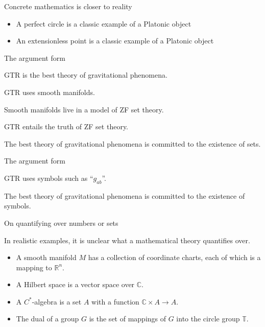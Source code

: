 \documentclass{beamer}
\begin{document}
\begin{frame}{Concrete mathematics is closer to reality}

  \begin{itemize}
  \item A perfect circle is a classic example of a Platonic object
  \item An extensionless point is a classic example of a Platonic
    object
  \end{itemize}

\end{frame}


\begin{frame}{The argument form}

  GTR is the best theory of gravitational phenomena. 

  GTR uses smooth manifolds. 

  Smooth manifolds live in a model of ZF set theory.

  GTR entails the truth of ZF set theory.

  The best theory of gravitational phenomena is committed to the
  existence of sets.

\end{frame}

\begin{frame}{The argument form}

  GTR uses symbols such as ``$g_{ab}$''. 

  The best theory of gravitational phenomena is committed to the
  existence of symbols.

\end{frame}


\begin{frame}{On quantifying over numbers or sets}

  In realistic examples, it is unclear what a mathematical theory
  quantifies over.

  \begin{itemize}
  \item A smooth manifold $M$ has a collection of coordinate charts,
    each of which is a mapping to $\mathbb{R}^n$.
  \item A Hilbert space is a vector space over $\mathbb{C}$.
  \item A $C^*$-algebra is a set $A$ with a function
    $\mathbb{C}\times A\to A$.
  \item The dual of a group $G$ is the set of mappings of $G$ into the
    circle group $\mathbb{T}$.
  \end{itemize}

\end{frame}
\end{document}

